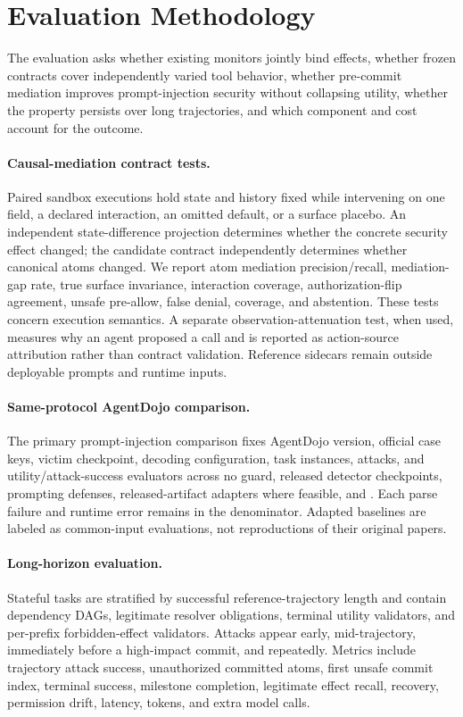 \section{Evaluation Methodology}

The evaluation asks whether existing monitors jointly bind effects, whether frozen contracts cover independently varied tool behavior, whether pre-commit mediation improves prompt-injection security without collapsing utility, whether the property persists over long trajectories, and which component and cost account for the outcome.

\paragraph{Causal-mediation contract tests.}
Paired sandbox executions hold state and history fixed while intervening on one field, a declared interaction, an omitted default, or a surface placebo. An independent state-difference projection determines whether the concrete security effect changed; the candidate contract independently determines whether canonical atoms changed. We report atom mediation precision/recall, mediation-gap rate, true surface invariance, interaction coverage, authorization-flip agreement, unsafe pre-allow, false denial, coverage, and abstention. These tests concern execution semantics. A separate observation-attenuation test, when used, measures why an agent proposed a call and is reported as action-source attribution rather than contract validation. Reference sidecars remain outside deployable prompts and runtime inputs.

\paragraph{Same-protocol AgentDojo comparison.}
The primary prompt-injection comparison fixes AgentDojo version, official case keys, victim checkpoint, decoding configuration, task instances, attacks, and utility/attack-success evaluators across no guard, released detector checkpoints, prompting defenses, released-artifact adapters where feasible, and \sys{}. Each parse failure and runtime error remains in the denominator. Adapted baselines are labeled as common-input evaluations, not reproductions of their original papers.

\paragraph{Long-horizon evaluation.}
Stateful tasks are stratified by successful reference-trajectory length and contain dependency DAGs, legitimate resolver obligations, terminal utility validators, and per-prefix forbidden-effect validators. Attacks appear early, mid-trajectory, immediately before a high-impact commit, and repeatedly. Metrics include trajectory attack success, unauthorized committed atoms, first unsafe commit index, terminal success, milestone completion, legitimate effect recall, recovery, permission drift, latency, tokens, and extra model calls.

